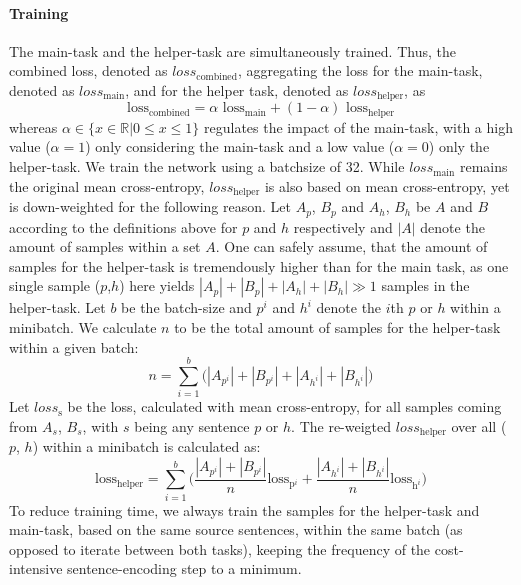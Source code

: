 \paragraph*{Training}
The main-task and the helper-task are simultaneously trained. Thus, the combined loss, denoted as $loss_\text{combined}$, aggregating the loss for the main-task, denoted as $loss_\text{main}$, and for the helper task, denoted as $loss_\text{helper}$, as
\begin{equation}
\label{eq:multitask_aggregate}
\text{loss}_\text{combined} = \alpha \text{ loss}_\text{main} + (1 - \alpha)\text{ loss}_\text{helper}
\end{equation}
whereas $\alpha \in \{x \in \mathbb{R} | 0 \leq x \leq 1\}$ regulates the impact of the main-task, with a high value ($\alpha = 1$) only considering the main-task and a low value ($\alpha = 0$) only the helper-task. We train the network using a batchsize of 32. While $loss_\text{main}$ remains the original mean cross-entropy, $loss_\text{helper}$ is also based on mean cross-entropy, yet is down-weighted for the following reason. Let $A_p$, $B_p$ and $A_h$, $B_h$ be $A$ and $B$ according to the definitions above for $p$ and $h$ respectively and $|A|$ denote the amount of samples within a set $A$. One can safely assume, that the amount of samples for the helper-task is tremendously higher than for the main task, as one single sample ($p$,$h$) here yields $|A_p|+|B_p|+|A_h|+|B_h| \gg 1$ samples in the helper-task. Let $b$ be the batch-size and $p^i$ and $h^i$ denote the $i$th $p$ or $h$ within a minibatch. We calculate $n$ to be the total amount of samples for the helper-task within a given batch:
\begin{equation}
n = \sum^b_{i=1}\Big(|A_{p^i}|+|B_{p^i}|+|A_{h^i}|+|B_{h^i}|\Big)
\end{equation}
Let $loss_\text{s}$ be the loss, calculated with mean cross-entropy, for all samples coming from $A_s$, $B_s$, with $s$ being any sentence $p$ or $h$. The re-weigted $loss_\text{helper}$ over all ($p$, $h$) within a minibatch is calculated as:
\begin{equation}
\text{loss}_\text{helper} = \sum^b_{i=1}\bigg( \frac{|A_{p^i}| + |B_{p^i}|}{n} \text{loss}_{\text{p}^i} + \frac{|A_{h^i}| + |B_{h^i}|}{n} \text{loss}_{\text{h}^i} \bigg)
\end{equation}
To reduce training time, we always train the samples for the helper-task and main-task, based on the same source sentences, within the same batch (as opposed to iterate between both tasks), keeping the frequency of the cost-intensive sentence-encoding step to a minimum.

